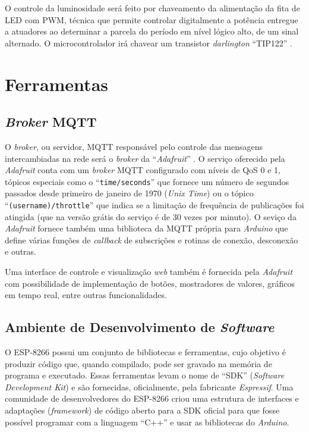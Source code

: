 O controle da luminosidade será feito por chaveamento da alimentação da fita de LED com \acf{PWM}, técnica que permite controlar digitalmente a potência entregue a atuadores ao determinar a parcela do período em nível lógico alto, de um sinal alternado. O microcontrolador irá chavear um transistor \textit{darlington} “TIP122” \cite{tip122}.

\section{Ferramentas}

\subsection{\textit{Broker} MQTT}

O \textit{broker}, ou servidor, MQTT responsável pelo controle das mensagens intercambiadas na rede será o \textit{broker} da ``\textit{Adafruit}'' \cite{adafruit}. O serviço oferecido pela \textit{Adafruit} conta com um  \textit{broker} MQTT configurado com níveis de QoS 0 e 1, tópicos especiais como o ``\texttt{time/seconds}'' que fornece um número de segundos passados desde primeiro de janeiro de 1970 (\textit{Unix Time}) ou o tópico ``\texttt{(username)/throttle}'' que indica se a limitação de frequência de publicações foi atingida (que na versão grátis do serviço é de 30 vezes por minuto). O seviço da \textit{Adafruit} fornece também uma biblioteca da MQTT própria para \textit{Arduino} que define várias funções de \textit{callback} de subscrições e rotinas de conexão, desconexão e outras.

Uma interface de controle e visualização \textit{web} também é fornecida pela \textit{Adafruit} com possibilidade de implementação de botões, mostradores de valores, gráficos em tempo real, entre outras funcionalidades.

\subsection{Ambiente de Desenvolvimento de \textit{Software}}

O ESP-8266 possui um conjunto de bibliotecas e ferramentas, cujo objetivo é produzir código que, quando compilado, pode ser gravado na memória de programa e executado. Essas ferramentas levam o nome de ``SDK'' (\textit{Software Development Kit}) e são fornecidas, oficialmente, pela fabricante \textit{Espressif}. Uma comunidade de desenvolvedores do ESP-8266 criou uma estrutura de interfaces e adaptações (\textit{framework}) de código aberto para a SDK oficial para que fosse possível programar com a linguagem ``C++'' e usar as bibliotecas do \textit{Arduino}.

